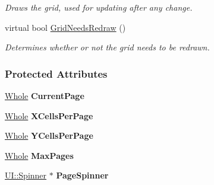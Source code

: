 \begin{DoxyCompactItemize}
\begin{DoxyCompactList}\small\item\em Draws the grid, used for updating after any change. \item\end{DoxyCompactList}\item 
\hypertarget{classphys_1_1UI_1_1PagedCellGrid_a31d1ab9c67af49b992162e84ad750356}{
virtual bool \hyperlink{classphys_1_1UI_1_1PagedCellGrid_a31d1ab9c67af49b992162e84ad750356}{GridNeedsRedraw} ()}
\label{d5/d27/classphys_1_1UI_1_1PagedCellGrid_a31d1ab9c67af49b992162e84ad750356}

\begin{DoxyCompactList}\small\item\em Determines whether or not the grid needs to be redrawn. \item\end{DoxyCompactList}\end{DoxyCompactItemize}
\subsubsection*{Protected Attributes}
\begin{DoxyCompactItemize}
\item 
\hypertarget{classphys_1_1UI_1_1PagedCellGrid_ae2ce49bd86b1c675b3a0eaef3252a9da}{
\hyperlink{namespacephys_a460f6bc24c8dd347b05e0366ae34f34a}{Whole} {\bfseries CurrentPage}}
\label{d5/d27/classphys_1_1UI_1_1PagedCellGrid_ae2ce49bd86b1c675b3a0eaef3252a9da}

\item 
\hypertarget{classphys_1_1UI_1_1PagedCellGrid_a914e320c60481730adde14b6db386882}{
\hyperlink{namespacephys_a460f6bc24c8dd347b05e0366ae34f34a}{Whole} {\bfseries XCellsPerPage}}
\label{d5/d27/classphys_1_1UI_1_1PagedCellGrid_a914e320c60481730adde14b6db386882}

\item 
\hypertarget{classphys_1_1UI_1_1PagedCellGrid_a27a1dd0c82747c04b3d4ff7f077f553b}{
\hyperlink{namespacephys_a460f6bc24c8dd347b05e0366ae34f34a}{Whole} {\bfseries YCellsPerPage}}
\label{d5/d27/classphys_1_1UI_1_1PagedCellGrid_a27a1dd0c82747c04b3d4ff7f077f553b}

\item 
\hypertarget{classphys_1_1UI_1_1PagedCellGrid_a8154eb0cf03edbe96f59d92b526058ef}{
\hyperlink{namespacephys_a460f6bc24c8dd347b05e0366ae34f34a}{Whole} {\bfseries MaxPages}}
\label{d5/d27/classphys_1_1UI_1_1PagedCellGrid_a8154eb0cf03edbe96f59d92b526058ef}

\item 
\hypertarget{classphys_1_1UI_1_1PagedCellGrid_a07b1db6a9b7adda5b66588fac8c7e4a1}{
\hyperlink{classphys_1_1UI_1_1Spinner}{UI::Spinner} $\ast$ {\bfseries PageSpinner}}
\label{d5/d27/classphys_1_1UI_1_1PagedCellGrid_a07b1db6a9b7adda5b66588fac8c7e4a1}

\end{DoxyCompactItemize}


